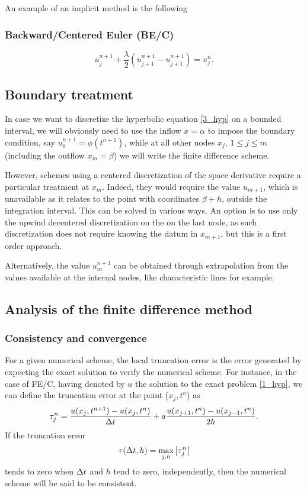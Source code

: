An example of an implicit method is the following
\subsubsection*{Backward/Centered Euler (BE/C)}
\begin{equation}
    u_j^{n+1} + \frac{\lambda}{2} (u^{n+1}_{j+1} - u^{n+1}_{j+1}) = u^n_j.
    \label{13_hyp}
\end{equation}
\subsection{Boundary treatment}
In case we want to discretize the hyperbolic equation \eqref{3_hyp} on a bounded interval, we will obviously need to use the inflow \(x=\alpha\) to impose the boundary condition, say \(u^{n+1}_0 = \phi(t^{n+1})\), while at all other nodes \(x_j\), \(1\leq j \leq m\) (including the outflow \(x_m = \beta\)) we will write the finite difference scheme. 

However, schemes using a centered discretization of the space derivative require a particular treatment at \(x_m\). Indeed, they would require the value \(u_{m+1}\), which is unavailable as it relates to the point with coordinates \(\beta + h\), outside the integration interval. This can be solved in various ways. An option is to use only the upwind decentered discretization on the on the last node, as such discretization does not require knowing the datum in \(x_{m+1}\), but this is a first order approach.

Alternatively, the value \(u_m^{n+1}\) can be obtained through extrapolation from the values available at the internal nodes, like characteristic lines for example. 
\subsection{Analysis of the finite difference method}
\subsubsection*{Consistency and convergence}
For a given numerical scheme, the local truncation error is the error generated by expecting the exact solution to verify the numerical scheme. For instance, in the case of FE/C, having denoted by \(u\) the solution to the exact problem \eqref{1_hyp}, we can define the truncation error at the point (\(x_j, t^n\)) as 
\[
    \tau_j^n = \frac{u(x_j,t^{n+1}) - u(x_j, t^n)}{\Delta t} + a\frac{u(x_{j+1}, t^n)- u(x_{j-1}, t^n)}{2h}.
\]
If the truncation error 
\[
    \tau(\Delta t, h) = \max_{j,n}\abs{\tau_j^n}
\]
tends to zero when \(\Delta t\) and \(h\) tend to zero, independently, then the numerical scheme will be said to be consistent.

